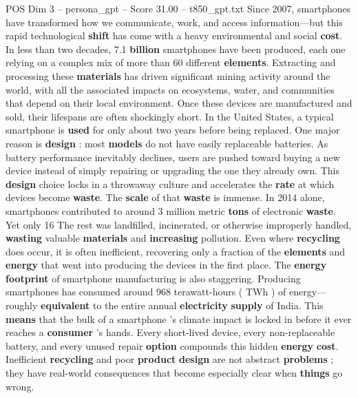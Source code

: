 \begin{textsample}{POS Dim 3 – persona\_gpt – Score 31.00 – t850\_gpt.txt}  \label{ex:f3_pos_030}
Since 2007, smartphones have transformed how we communicate, work, and access information—but this rapid technological \textbf{shift} has come with a heavy environmental and social \textbf{cost}.
In less than two decades, 7.1 \textbf{billion} smartphones have been produced, each one relying on a complex mix of more than 60 different \textbf{elements}.
Extracting and processing these \textbf{materials} has driven significant mining activity around the world, with all the associated impacts on ecosystems, water, and communities that depend on their local environment.
Once these devices are manufactured and sold, their lifespans are often shockingly short.
In the United States, a typical smartphone is \textbf{used} for only about two years before being replaced.
One major reason is \textbf{design} : most \textbf{models} do not have easily replaceable batteries.
As battery performance inevitably declines, users are pushed toward buying a new device instead of simply repairing or upgrading the one they already own.
This \textbf{design} choice locks in a throwaway culture and accelerates the \textbf{rate} at which devices become \textbf{waste}.
The \textbf{scale} of that \textbf{waste} is immense.
In 2014 alone, smartphones contributed to around 3 million metric \textbf{tons} of electronic \textbf{waste}.
Yet only 16 %
The rest was landfilled, incinerated, or otherwise improperly handled, \textbf{wasting} valuable \textbf{materials} and \textbf{increasing} pollution.
Even where \textbf{recycling} does occur, it is often inefficient, recovering only a fraction of the \textbf{elements} and \textbf{energy} that went into producing the devices in the first place.
The \textbf{energy} \textbf{footprint} of smartphone manufacturing is also staggering.
Producing smartphones has consumed around 968 terawatt-hours ( TWh ) of energy—roughly \textbf{equivalent} to the entire annual \textbf{electricity} \textbf{supply} of India.
This \textbf{means} that the bulk of a smartphone ’s climate impact is locked in before it ever reaches a \textbf{consumer} ’s hands.
Every short-lived device, every non-replaceable battery, and every unused repair \textbf{option} compounds this hidden \textbf{energy} \textbf{cost}.
Inefficient \textbf{recycling} and poor \textbf{product} \textbf{design} are not abstract \textbf{problems} ; they have real-world consequences that become especially clear when \textbf{things} go wrong.

\end{textsample}
